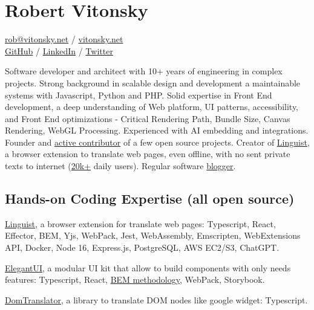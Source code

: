 \documentclass{vitonsky}
\begin{document}
\vitonskyPrintPhoto{}

\section*{\Large{Robert Vitonsky}}

\href{mailto:rob@vitonsky.net}{rob@vitonsky.net} / \href{https://vitonsky.net}{vitonsky.net}\\%
\href{https://github.com/vitonsky}{GitHub} /
\href{https://www.linkedin.com/in/vitonsky}{LinkedIn} /
\href{https://twitter.com/intent/follow?screen_name=rob_vitonsky}{Twitter}

\vspace*{12pt}

Software developer and architect with 10+ years of engineering in complex projects. Strong background in scalable design and development a maintainable systems with Javascript, Python and PHP. Solid expertise in Front End development, a deep understanding of Web platform, UI patterns, accessibility, and Front End optimizations - Critical Rendering Path, Bundle Size, Canvas Rendering, WebGL Processing. Experienced with AI embedding and integrations. Founder and \href{https://github.com/vitonsky}{active contributor} of a few open source projects. Creator of \href{https://github.com/translate-tools/linguist}{Linguist}, a browser extension to translate web pages, even offline, with no sent private texts to internet (\href{https://github.com/translate-tools/linguist}{20k+} daily users). Regular software \href{https://vitonsky.net/}{blogger}.

\subsection*{Hands-on Coding Expertise (all open source)}

\href{https://github.com/translate-tools/linguist}{Linguist}, a browser
extension for translate web pages: Typescript, React, Effector, BEM,
Yjs, WebPack, Jest, WebAssembly, Emscripten, WebExtensions API, Docker,
Node 16, Express.js, PostgreSQL, AWS EC2/S3, ChatGPT.

\href{https://github.com/vitonsky/react-elegant-ui}{ElegantUI}, a
modular UI kit that allow to build components with only needs features:
Typescript, React, \href{https://en.bem.info/methodology/quick-start/}{BEM methodology},
WebPack, Storybook.

\href{https://github.com/translate-tools/domtranslator}{DomTranslator}, a library to translate DOM nodes like google widget: Typescript.
\end{document}
